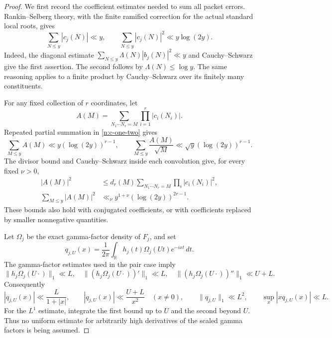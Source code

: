 \documentclass[11pt]{article}
\numberwithin{equation}{section}
\theoremstyle{remark}
\begin{document}
\begin{proof}
We first record the coefficient estimates needed to sum all packet
errors. Rankin--Selberg theory, with the finite ramified correction for
the actual standard local roots, gives
\begin{equation}\label{n:c-one-two}
 \sum_{N\le y}|c_j(N)|\ll y,\qquad
 \sum_{N\le y}|c_j(N)|^2\ll y\log(2y).
\end{equation}
Indeed, the diagonal estimate
$\sum_{N\le y}\Lambda(N)|b_j(N)|^2\ll y$ and Cauchy--Schwarz
give the first assertion. The second follows by
$\Lambda(N)\le\log y$. The same reasoning applies to a finite product
by Cauchy--Schwarz over its finitely many constituents.

For any fixed collection of $r$ coordinates, let
\[
 A(M)=\sum_{N_1\cdots N_r=M}\prod_{i=1}^r|c_i(N_i)|.
\]
Repeated partial summation in \eqref{n:c-one-two} gives
\begin{equation}\label{n:convolution-lone}
 \sum_{M\le y}A(M)\ll y(\log(2y))^{r-1},\qquad
 \sum_{M\le y}\frac{A(M)}{\sqrt M}
       \ll \sqrt y(\log(2y))^{r-1}.
\end{equation}
The divisor bound and Cauchy--Schwarz inside each convolution give,
for every fixed $\nu>0$,
\begin{align}
 |A(M)|^2
 &\le d_r(M)\sum_{N_1\cdots N_r=M}\prod_i|c_i(N_i)|^2,
       \nonumber\\
 \sum_{M\le y}|A(M)|^2
 &\ll_\nu y^{1+\nu}(\log(2y))^{2r-1}.
       \label{n:convolution-ltwo}
\end{align}
These bounds also hold with conjugated coefficients, or with
coefficients replaced by smaller nonnegative quantities.

Let $\Omega_j$ be the exact gamma-factor density of $F_j$, and set
\[
 q_{j,U}(x)=\frac1{2\pi}\int_{\mathbb R}
               h_j(t)\Omega_j(Ut)e^{-ixt}\,dt.
\]
The gamma-factor estimates used in the pair case imply
\[
 \|h_j\Omega_j(U\cdot)\|_1\ll L,\quad
 \|(h_j\Omega_j(U\cdot))'\|_1\ll L,\quad
 \|(h_j\Omega_j(U\cdot))''\|_1\ll U+L.
\]
Consequently
\begin{equation}\label{n:q-estimates}
 |q_{j,U}(x)|\ll\frac{L}{1+|x|},\qquad
 |q_{j,U}(x)|\ll\frac{U+L}{x^2}\quad(x\ne0),\qquad
 \|q_{j,U}\|_1\ll L^2,\qquad
 \sup_x|xq_{j,U}(x)|\ll L.
\end{equation}
For the $L^1$ estimate, integrate the first bound up to $U$ and the
second beyond $U$. Thus no uniform estimate for arbitrarily high
derivatives of the scaled gamma factors is being assumed.


\end{proof}
\end{document}
